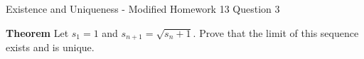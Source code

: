 Existence and Uniqueness - Modified Homework 13 Question 3



\textbf{Theorem}
Let $s_1=1$ and $s_{n+1}=\sqrt{s_n+1}$.  Prove that the limit of this sequence exists and is unique.

